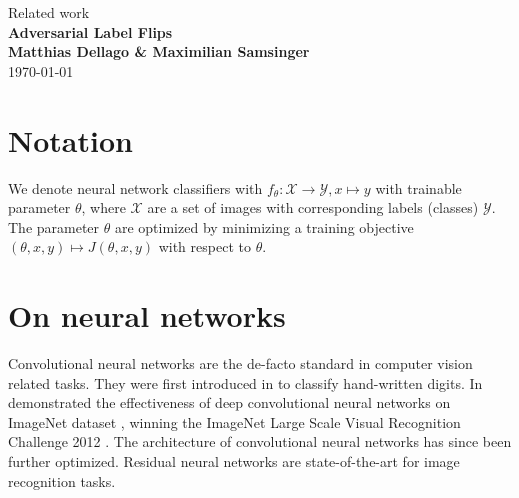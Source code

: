 \documentclass{article}
\begin{document}
\begin{titlepage}
	\noindent{}
	\vspace{3cm}
	\begin{center}
		{\Large Related work}
		\vspace{50pt}\\
		\textbf{\Huge Adversarial Label Flips}
		\vspace{40pt}\\
		\textbf{\Large Matthias Dellago \& Maximilian Samsinger}\vspace{20pt}\\
		{\large\today}
		\vspace{120pt}
	\end{center}
\end{titlepage}
	
	\DeclarePairedDelimiter\abs{\lvert}{\rvert}%
	\DeclarePairedDelimiter\norm{\lVert}{\rVert}%
	\DeclarePairedDelimiter\ceil{\lceil}{\rceil}
	\DeclarePairedDelimiter\floor{\lfloor}{\rfloor}

\section{Notation}
We denote neural network classifiers with ${f_\theta\colon\mathcal{X}\to\mathcal{Y}, x\mapsto y}$ with trainable parameter $\theta$, where $\mathcal{X}$ are a set of images with corresponding labels (classes) $\mathcal{Y}$. The parameter $\theta$ are optimized by minimizing a training objective ${(\theta, x, y) \mapsto J(\theta, x, y)}$ with respect to $\theta$.

\section{On neural networks}	
Convolutional neural networks are the de-facto standard in computer vision related tasks. They were first introduced in \cite{lecun1989backpropagation} to classify hand-written digits. In
\cite{krizhevsky2012imagenet} demonstrated the effectiveness of deep convolutional neural networks on ImageNet dataset \cite{deng2009imagenet}, winning the ImageNet Large Scale Visual Recognition Challenge 2012 \cite{ILSVRC15}. The architecture of convolutional neural networks has since been further optimized. Residual neural networks \cite{he2016deep} are state-of-the-art for image recognition tasks.
\end{document}
